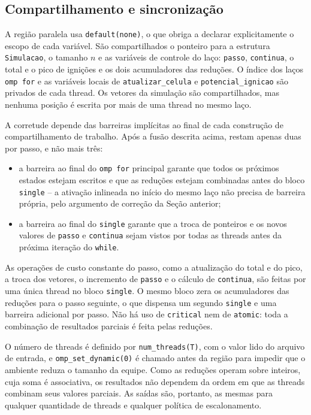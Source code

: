 \documentclass[12pt,a4paper]{article}
\begin{document}
\subsection{Compartilhamento e sincronização}

A região paralela usa \texttt{default(none)}, o que obriga a declarar
explicitamente o escopo de cada variável. São compartilhados o ponteiro
para a estrutura \texttt{Simulacao}, o tamanho $n$ e as variáveis de
controle do laço: \texttt{passo}, \texttt{continua}, o total e o pico
de ignições e os dois acumuladores das reduções. O índice dos laços
\texttt{omp for} e as variáveis locais de \texttt{atualizar\_celula} e
\texttt{potencial\_ignicao} são privados de cada thread. Os vetores
da simulação são compartilhados, mas nenhuma posição é escrita por mais
de uma thread no mesmo laço.

A corretude depende das barreiras implícitas ao final de cada construção
de compartilhamento de trabalho. Após a fusão descrita acima, restam
apenas duas por passo, e não mais três:

\begin{itemize}
\item a barreira ao final do \texttt{omp for} principal garante que
todos os próximos estados estejam escritos e que as reduções estejam
combinadas antes do bloco \texttt{single} -- a ativação inlineada no
início do mesmo laço não precisa de barreira própria, pelo argumento de
correção da Seção anterior;
\item a barreira ao final do \texttt{single} garante que a troca de
ponteiros e os novos valores de \texttt{passo} e \texttt{continua} sejam
vistos por todas as threads antes da próxima iteração do
\texttt{while}.
\end{itemize}

As operações de custo constante do passo, como a atualização do total e
do pico, a troca dos vetores, o incremento de \texttt{passo} e o cálculo
de \texttt{continua}, são feitas por uma única thread no bloco
\texttt{single}. O mesmo bloco zera os acumuladores das reduções para o
passo seguinte, o que dispensa um segundo \texttt{single} e uma barreira
adicional por passo. Não há uso de \texttt{critical} nem de
\texttt{atomic}: toda a combinação de resultados parciais é feita pelas
reduções.

O número de threads é definido por \texttt{num\_threads(T)}, com o valor
lido do arquivo de entrada, e \texttt{omp\_set\_dynamic(0)} é chamado
antes da região para impedir que o ambiente reduza o tamanho da equipe.
Como as reduções operam sobre inteiros, cuja soma é associativa, os
resultados não dependem da ordem em que as threads combinam seus valores
parciais. As saídas são, portanto, as mesmas para qualquer quantidade de
threads e qualquer política de escalonamento.
\end{document}
